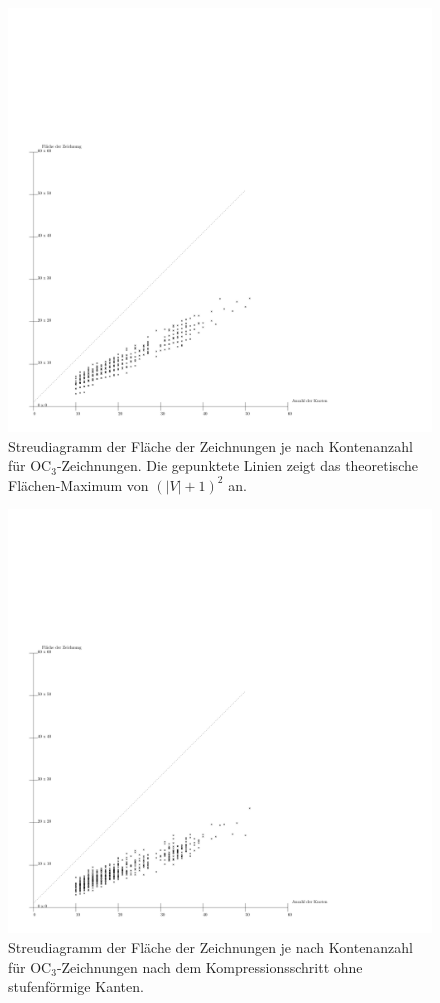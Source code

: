 \documentclass[a4paper]{scrreprt}
\theoremstyle{definition}
\begin{document}
\begin{figure}[p]
  \centering
  \includegraphics[width=\textwidth]{plots/ortho-noCompress}
  \caption{Streudiagramm der Fläche der Zeichnungen je nach Kontenanzahl für OC$_3$-Zeichnungen. Die gepunktete Linien zeigt das theoretische Flächen-Maximum von $(|V|+1)^2$ an.}
  \label{fig:ortho-noCompress}
\end{figure}
\begin{figure}[p]
  \centering
  \includegraphics[width=\textwidth]{plots/ortho-compress}
  \caption{Streudiagramm der Fläche der Zeichnungen je nach Kontenanzahl für OC$_3$-Zeichnungen nach dem Kompressionsschritt ohne stufenförmige Kanten.}
  \label{fig:ortho-compress}
\end{figure}
\end{document}

